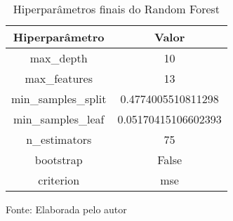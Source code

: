 
\begin{table}[h]
\centering
\caption{Hiperparâmetros finais do Random Forest}
\label{tab:cap3_parametros_random_forest}
\begin{tabular}{cc}
Hiperparâmetro & Valor \\
\hline
max_depth & 10 \\
max_features & 13 \\
min_samples_split & 0.4774005510811298 \\
min_samples_leaf & 0.05170415106602393 \\
n_estimators & 75 \\
bootstrap & False \\
criterion & mse \\
\hline
\end{tabular}

Fonte: Elaborada pelo autor
\end{table}











